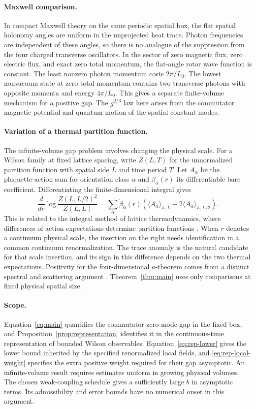 \documentclass[11pt,a4paper]{article}
\numberwithin{equation}{section}
\begin{document}
\paragraph{Maxwell comparison.}
In compact Maxwell theory on the same periodic spatial box, the flat spatial holonomy angles are uniform in the unprojected heat trace. Photon frequencies are independent of these angles, so there is no analogue of the suppression from the four charged transverse oscillators. In the sector of zero magnetic flux, zero electric flux, and exact zero total momentum, the flat-angle rotor wave function is constant. The least nonzero photon momentum costs \(2\pi/L_0\). The lowest nonvacuum state at zero total momentum contains two transverse photons with opposite momenta and energy \(4\pi/L_0\). This gives a separate finite-volume mechanism for a positive gap. The \(g^{2/3}\) law here arises from the commutator magnetic potential and quantum motion of the spatial constant modes.

\paragraph{Variation of a thermal partition function.}
The infinite-volume gap problem involves changing the physical scale. For a Wilson family at fixed lattice spacing, write \(Z(L,T)\) for the unnormalized partition function with spatial side \(L\) and time period \(T\). Let \(A_\alpha\) be the plaquette-action sum for orientation class \(\alpha\) and \(\beta_\alpha(r)\) its differentiable bare coefficient. Differentiating the finite-dimensional integral gives
\[
 \frac{d}{dr}\log\frac{Z(L,L/2)^2}{Z(L,L)}
 =\sum_\alpha\dot\beta_\alpha(r)
 \left(\langle A_\alpha\rangle_{L,L}
               -2\langle A_\alpha\rangle_{L,L/2}\right).
\]
This is related to the integral method of lattice thermodynamics, where differences of action expectations determine partition functions \cite{thermodynamics}. When \(r\) denotes a continuum physical scale, the insertion on the right needs identification in a common continuum renormalization. The trace anomaly is the natural candidate for that scale insertion, and its sign in this difference depends on the two thermal expectations. Positivity for the four-dimensional \(a\)-theorem comes from a distinct spectral and scattering argument \cite{a-theorem}. Theorem~\ref{thm:main} uses only comparisons at fixed physical spatial size.

\paragraph{Scope.}
Equation~\eqref{eq:main} quantifies the commutator zero-mode gap in the fixed box, and Proposition~\ref{prop:representation} identifies it in the continuous-time representation of bounded Wilson observables. Equation~\eqref{eq:rep-lower} gives the lower bound inherited by the specified renormalized local fields, and \eqref{eq:rep-local-weight} specifies the extra positive weight required for their gap asymptotic. An infinite-volume result requires estimates uniform in growing physical volumes. The chosen weak-coupling schedule gives a sufficiently large \(b\) in asymptotic terms. Its admissibility and error bounds have no numerical onset in this argument.
\end{document}
